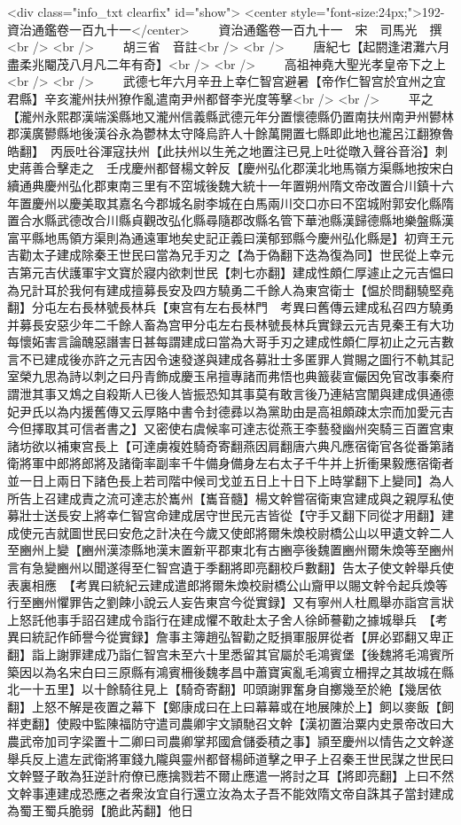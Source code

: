 <div class="info_txt clearfix" id="show">
<center style="font-size:24px;">192-資治通鑑卷一百九十一</center>
  　　資治通鑑卷一百九十一　宋　司馬光　撰<br />
<br />
　　胡三省　音註<br />
<br />
　　唐紀七【起閼逢涒灘六月盡柔兆閹茂八月凡二年有奇】<br />
<br />
　　高祖神堯大聖光孝皇帝下之上<br />
<br />
　　武德七年六月辛丑上幸仁智宫避暑【帝作仁智宫於宜州之宜君縣】辛亥瀧州扶州獠作亂遣南尹州都督李光度等擊<br />
<br />
　　平之【瀧州永熙郡漢端溪縣地又瀧州信義縣武德元年分置懷德縣仍置南扶州南尹州鬰林郡漢廣鬰縣地後漢谷永為鬱林太守降烏許人十餘萬開置七縣即此地也瀧呂江翻獠魯皓翻】　丙辰吐谷渾寇扶州【此扶州以生羌之地置注已見上吐從暾入聲谷音浴】刺史蔣善合擊走之　壬戌慶州都督楊文幹反【慶州弘化郡漢北地馬嶺方渠縣地按宋白續通典慶州弘化郡東南三里有不窋城後魏大統十一年置朔州隋文帝改置合川鎮十六年置慶州以慶美取其嘉名今郡城名尉李城在白馬兩川交口亦曰不窋城附郭安化縣隋置合水縣武德改合川縣貞觀改弘化縣尋隨郡改縣名管下華池縣漢歸德縣地樂盤縣漢富平縣地馬領方渠則為通遠軍地矣史記正義曰漢郁郅縣今慶州弘化縣是】初齊王元吉勸太子建成除秦王世民曰當為兄手刃之【為于偽翻下迭為復為同】世民從上幸元吉第元吉伏護軍宇文寶於寢内欲刺世民【刺七亦翻】建成性頗仁厚遽止之元吉愠曰為兄計耳於我何有建成擅募長安及四方驍勇二千餘人為東宫衛士【愠於問翻驍堅堯翻】分屯左右長林號長林兵【東宫有左右長林門　考異曰舊傳云建成私召四方驍勇并募長安惡少年二千餘人畜為宫甲分屯左右長林號長林兵實録云元吉見秦王有大功每懷妬害言論醜惡譖害日甚每謂建成曰當為大哥手刃之建成性頗仁厚初止之元吉數言不已建成後亦許之元吉因令速發遂與建成各募壯士多匿罪人賞賜之圖行不軌其記室榮九思為詩以刺之曰丹青飾成慶玉帛擅專諸而弗悟也典籖裴宣儼因免官改事秦府謂泄其事又鴆之自殺斯人已後人皆振恐知其事莫有敢言後乃連結宫闈與建成俱通德妃尹氏以為内援舊傳又云厚賂中書令封德彞以為黨助由是高祖頗疎太宗而加愛元吉今但擇取其可信者書之】又密使右虞候率可達志從燕王李藝發幽州突騎三百置宫東諸坊欲以補東宫長上【可達虜複姓騎奇寄翻燕因肩翻唐六典凡應宿衛官各從番第諸衛將軍中郎將郎將及諸衛率副率千牛備身備身左右太子千牛并上折衝果毅應宿衛者並一日上兩日下諸色長上若司階中候司戈並五日上十日下上時掌翻下上變同】為人所告上召建成責之流可達志於巂州【巂音髓】楊文幹嘗宿衛東宫建成與之親厚私使募壯士送長安上將幸仁智宫命建成居守世民元吉皆從【守手又翻下同從才用翻】建成使元吉就圖世民曰安危之計决在今歲又使郎將爾朱煥校尉橋公山以甲遺文幹二人至豳州上變【豳州漢漆縣地漢末置新平郡東北有古豳亭後魏置豳州爾朱煥等至豳州言有急變豳州以聞遂得至仁智宫遺于季翻將即亮翻校戶數翻】告太子使文幹舉兵使表裏相應　【考異曰統紀云建成遣郎將爾朱煥校尉橋公山齎甲以賜文幹令起兵煥等行至豳州懼罪告之劉餗小說云人妄告東宫今從實録】又有寧州人杜鳳舉亦詣宫言狀上怒託他事手詔召建成令詣行在建成懼不敢赴太子舍人徐師謩勸之據城舉兵　【考異曰統記作師譽今從實録】詹事主簿趙弘智勸之貶損軍服屏從者【屏必郢翻又卑正翻】詣上謝罪建成乃詣仁智宫未至六十里悉留其官屬於毛鴻賓堡【後魏將毛鴻賓所築因以為名宋白曰三原縣有鴻賓柵後魏孝昌中蕭寶寅亂毛鴻賓立柵捍之其故城在縣北一十五里】以十餘騎往見上【騎奇寄翻】叩頭謝罪奮身自擲幾至於絶【幾居依翻】上怒不解是夜置之幕下【鄭康成曰在上曰幕幕或在地展陳於上】飼以麥飯【飼祥吏翻】使殿中監陳福防守遣司農卿宇文頴馳召文幹【漢初置治粟内史景帝改曰大農武帝加司字梁置十二卿曰司農卿掌邦國倉儲委積之事】頴至慶州以情告之文幹遂舉兵反上遣左武衛將軍錢九隴與靈州都督楊師道擊之甲子上召秦王世民謀之世民曰文幹豎子敢為狂逆計府僚已應擒戮若不爾止應遣一將討之耳【將即亮翻】上曰不然文幹事連建成恐應之者衆汝宜自行還立汝為太子吾不能效隋文帝自誅其子當封建成為蜀王蜀兵脆弱【脆此芮翻】他日